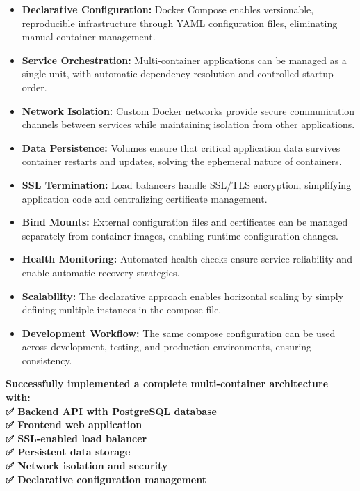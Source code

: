 \documentclass[12pt,a4paper]{article}
\begin{document}
\begin{itemize}
    \item \textbf{Declarative Configuration:} Docker Compose enables versionable, reproducible infrastructure through YAML configuration files, eliminating manual container management.

    \item \textbf{Service Orchestration:} Multi-container applications can be managed as a single unit, with automatic dependency resolution and controlled startup order.

    \item \textbf{Network Isolation:} Custom Docker networks provide secure communication channels between services while maintaining isolation from other applications.

    \item \textbf{Data Persistence:} Volumes ensure that critical application data survives container restarts and updates, solving the ephemeral nature of containers.

    \item \textbf{SSL Termination:} Load balancers handle SSL/TLS encryption, simplifying application code and centralizing certificate management.

    \item \textbf{Bind Mounts:} External configuration files and certificates can be managed separately from container images, enabling runtime configuration changes.

    \item \textbf{Health Monitoring:} Automated health checks ensure service reliability and enable automatic recovery strategies.

    \item \textbf{Scalability:} The declarative approach enables horizontal scaling by simply defining multiple instances in the compose file.

    \item \textbf{Development Workflow:} The same compose configuration can be used across development, testing, and production environments, ensuring consistency.
\end{itemize}

\vspace{0.5cm}

\begin{tcolorbox}[colback=blue!5, colframe=primary, title=\textbf{Key Achievement}]
\centering
\textbf{Successfully implemented a complete multi-container architecture with:\\
✅ Backend API with PostgreSQL database\\
✅ Frontend web application\\
✅ SSL-enabled load balancer\\
✅ Persistent data storage\\
✅ Network isolation and security\\
✅ Declarative configuration management}
\end{tcolorbox}
\end{document}
